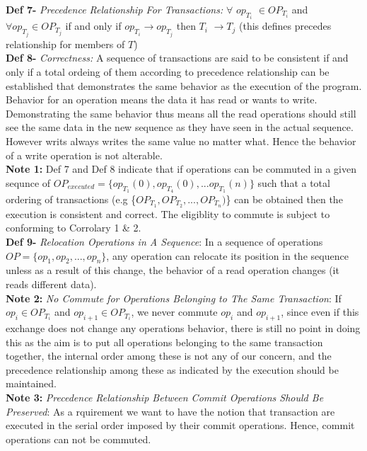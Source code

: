 \documentclass[a4paper, 11pt]{article}
\begin{document}
\textbf{Def 7-} \emph{Precedence Relationship For Transactions:} $\forall$ $op_{T_i}$ $\in OP_{T_i}$ and $\forall op_{T_j}\in OP_{T_j}$ if and only if $op_{T_i} \rightarrow op_{T_j}$ then $T_i$ $\rightarrow T_j$ \hspace{8mm} (this defines precedes relationship for members of $T$) \\

\textbf{Def 8-} \emph{Correctness:} A sequence of transactions are said to be consistent if and only if a total ordeing of them according to precedence relationship can be established that demonstrates the same behavior as the execution of the program. Behavior for an operation means the data it has read or wants to write. Demonstrating the same behavior thus means all the read operations should still see the same data in the new sequence as they have seen in the actual sequence. However writs always writes the same value no matter what. Hence the behavior of a write operation is not alterable.\\

\textbf{Note 1:} Def 7 and Def 8 indicate that if operations can be commuted in a given sequnce of $OP_{executed} = \{op_{T_1}(0), op_{T_4}(0), ... op_{T_1}(n)\}$ such that a total ordering of transactions (e.g \{$OP_{T_1}, OP_{T_2}, ..., OP_{T_n}) $\} can be obtained then the execution is consistent and correct. The eligiblity to commute is subject to conforming to Corrolary 1 \& 2.\\

\textbf{Def 9-} \emph{Relocation Operations in A Sequence}: In a sequence of operations $OP = \{op_1, op_2, ...,op_n\}$, any operation can relocate its position in the sequence unless as a result of this change, the behavior of a read operation changes (it reads different data).\\

\textbf{Note 2:} \emph{No Commute for Operations Belonging to The Same Transaction}: If $op_i \in OP_{T_i}$ and $op_{i+1} \in OP_{T_i}$, we never commute $op_i$ and $op_{i+1}$, since even if this exchange does not change any operations behavior, there is still no point in doing this as the aim is to put all operations belonging to the same transaction together, the internal order among these is not any of our concern, and the precedence relationship among these as indicated by the execution should be maintained.\\ 

\textbf{Note 3:} \emph{Precedence Relationship Between Commit Operations Should Be Preserved}: As a rquirement we want to have the notion that transaction are executed in the serial order imposed by their commit operations. Hence, commit operations can not be commuted.\\
\end{document}
